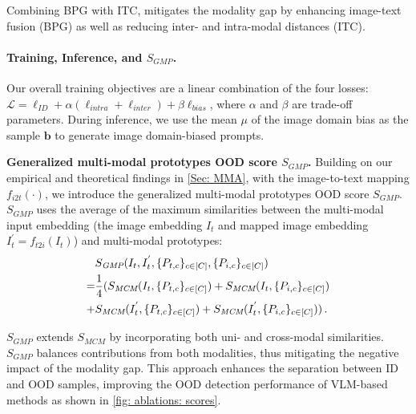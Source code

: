 Combining BPG with ITC, \ours mitigates the modality gap by enhancing image-text fusion (BPG) as well as reducing inter- and intra-modal distances (ITC).





\noindent
\paragraph{Training, Inference, and $S_{\textit{GMP}}$.}
Our overall training objectives are a linear combination of the four losses: $\mathcal{L} = \ell_{\textit{ID}} + \alpha( \ell_{\textit{intra}} + \ell_{\textit{inter}}) + \beta \ell_{\textit{bias}}$,
where $\alpha$ and $\beta$ are trade-off parameters. 
During inference, we use the mean $\mu$ of the image domain bias as the sample $\mathbf{b}$ to generate image domain-biased prompts. 


\noindent
\textbf{Generalized multi-modal prototypes OOD score $S_{\textit{GMP}}$.}
Building on our empirical and theoretical findings in \cref{Sec: MMA}, with the image-to-text mapping $f_{i2t}(\cdot)$, we introduce the generalized multi-modal prototypes OOD score $S_{\textit{GMP}}$. 
$S_{\textit{GMP}}$ uses the average of the maximum similarities between the multi-modal input embedding (the image embedding $I_t$ and mapped image embedding $I_t^{'} = f_{t2i}(I_t)$) and multi-modal prototypes:
    \begin{align}
    \small
        & S_{\textit{GMP}} (I_t, I_t^{'}, \{P_{t, c}\}_{c\in[C] }, \{P_{i, c}\}_{c\in[C]}) \label{eq: MMO} \\
        = & \frac{1}{4} (S_{\textit{MCM}}(I_t,\{P_{t, c}\}_{c\in[C]}) + S_{\textit{MCM}}(I_t,\{P_{i, c}\}_{c\in[C]}) \nonumber \\
        + & S_{\textit{MCM}}(I_t^{'},\{P_{t, c}\}_{c\in[C]}) + S_{\textit{MCM}}(I_t^{'},\{P_{i, c}\}_{c\in[C]})) \nonumber \,.
    \end{align}

\begin{remark}
    $S_{\textit{GMP}}$ extends $S_{\textit{MCM}}$ by incorporating both uni- and cross-modal similarities. 
    $S_{\textit{GMP}}$ balances contributions from both modalities, thus mitigating the negative impact of the modality gap. 
    This approach enhances the separation between ID and OOD samples, improving the OOD detection performance of VLM-based methods as shown in \cref{fig: ablations: scores}.
\end{remark}


